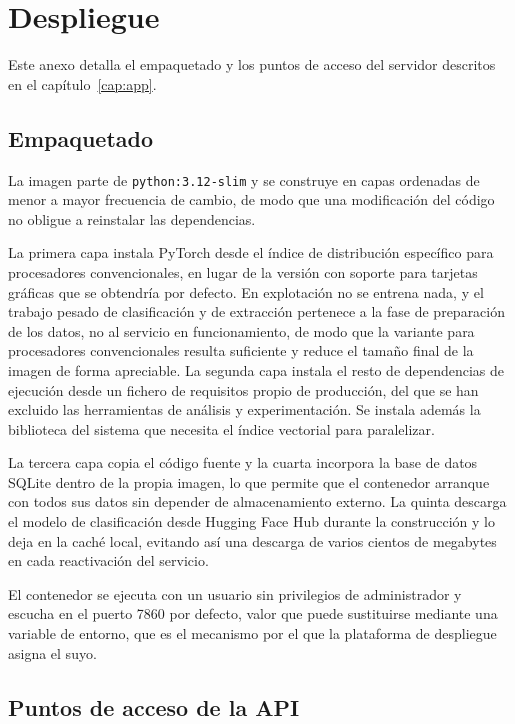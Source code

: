 \chapter{Despliegue}
\label{anx:despliegue}

Este anexo detalla el empaquetado y los puntos de acceso del servidor descritos
en el capítulo~\ref{cap:app}.

\section{Empaquetado}
\label{anx:empaquetado}

La imagen parte de \texttt{python:3.12-slim} y se construye en capas ordenadas de
menor a mayor frecuencia de cambio, de modo que una modificación del código no
obligue a reinstalar las dependencias.

La primera capa instala PyTorch desde el índice de distribución específico para
procesadores convencionales, en lugar de la versión con soporte para tarjetas
gráficas que se obtendría por defecto. En explotación no se entrena nada, y el
trabajo pesado de clasificación y de extracción pertenece a la fase de
preparación de los datos, no al servicio en funcionamiento, de modo que la
variante para procesadores convencionales resulta suficiente y reduce el tamaño
final de la imagen de forma apreciable. La segunda capa instala el resto de
dependencias de ejecución desde un fichero de requisitos propio de producción,
del que se han excluido las herramientas de análisis y experimentación. Se
instala además la biblioteca del sistema que necesita el índice vectorial para
paralelizar.

La tercera capa copia el código fuente y la cuarta incorpora la base de datos
SQLite dentro de la propia imagen, lo que permite que el contenedor arranque con
todos sus datos sin depender de almacenamiento externo. La quinta descarga el
modelo de clasificación desde Hugging Face Hub durante la construcción y lo deja
en la caché local, evitando así una descarga de varios cientos de megabytes en
cada reactivación del servicio.

El contenedor se ejecuta con un usuario sin privilegios de administrador y
escucha en el puerto 7860 por defecto, valor que puede sustituirse mediante una
variable de entorno, que es el mecanismo por el que la plataforma de despliegue
asigna el suyo.

\section{Puntos de acceso de la API}
\label{anx:endpoints}

